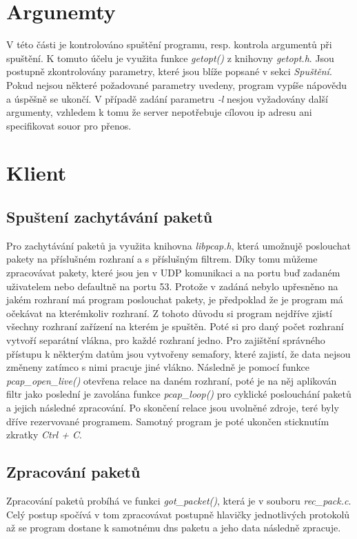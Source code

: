 \documentclass[a4paper, 11pt]{article}
\begin{document}
\section{Argunemty}
V této části je kontrolováno spuštění programu, resp. kontrola argumentů při spuštění. K tomuto účelu je využita funkce \textit{getopt()} z knihovny \textit{getopt.h}. Jsou postupně zkontrolovány parametry, které jsou blíže popsané v sekci \textit{Spuštění}. Pokud nejsou některé požadované parametry uvedeny, program vypíše nápovědu a úspěšně se ukončí. V případě zadání parametru \textit{-l} nesjou vyžadovány další argumenty, vzhledem k tomu že server nepotřebuje cílovou ip adresu ani specifikovat souor pro přenos.
\section{Klient}

\subsection{Spuštení zachytávání paketů}
Pro zachytávání paketů ja využita knihovna \textit{libpcap.h}, která umožnujě poslouchat pakety na příslušném rozhraní a s příslušným filtrem. Díky tomu můžeme zpracovávat pakety, které jsou jen v UDP komunikaci a na portu buď zadaném uživatelem nebo defaultně na portu 53. Protože v zadáná nebylo upřesněno na jakém rozhraní má program poslouchat pakety, je předpoklad že je program má očekávat na kterémkoliv rozhraní. Z tohoto důvodu si program nejdříve zjistí všechny rozhraní zařízení na kterém je spuštěn. Poté si pro daný počet rozhraní vytvoří separátní vlákna, pro každé rozhraní jedno. Pro zajištění správného přístupu k některým datům jsou vytvořeny semafory, které zajistí, že data nejsou změneny zatímco s nimi pracuje jiné vlákno. Následně je pomocí funkce \textit{pcap\_open\_live()} otevřena relace na daném rozhraní, poté je na něj aplikován filtr jako poslední je zavolána funkce \textit{pcap\_loop()} pro cyklické poslouchání paketů a jejich následné zpracování. Po skončení relace jsou uvolněné zdroje, teré byly dříve rezervované programem. Samotný program je poté ukončen sticknutím zkratky \textit{Ctrl + C}.

\subsection{Zpracování paketů}
Zpracování paketů probíhá ve funkci \textit{got\_packet()}, která je v souboru \textit{rec\_pack.c}. Celý postup spočívá v tom zpracovávat postupně hlavičky jednotlivých protokolů až se program dostane k samotnému dns paketu a jeho data následně zpracuje.
\end{document}
